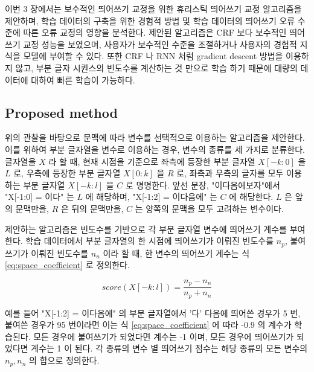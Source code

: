 \documentclass[11pt]{article}
\begin{document}
이번 3 장에서는 보수적인 띄어쓰기 교정을 위한 휴리스틱 띄어쓰기 교정 알고리즘을 제안하며, 학습 데이터의 구축을 위한 경험적 방법 및 학습 데이터의 띄어쓰기 오류 수준에 따른 오류 교정의 영향을 분석한다.
제안된 알고리즘은 CRF 보다 보수적인 띄어쓰기 교정 성능을 보였으며, 사용자가 보수적인 수준을 조절하거나 사용자의 경험적 지식을 모델에 부여할 수 있다.
또한 CRF 나 RNN 처럼 gradient descent 방법을 이용하지 않고, 부분 글자 시퀀스의 빈도수를 계산하는 것 만으로 학습 하기 때문에 대량의 데이터에 대하여 빠른 학습이 가능하다.

\subsection{Proposed method}

위의 관찰을 바탕으로 문맥에 따라 변수를 선택적으로 이용하는 알고리즘을 제안한다.
이를 위하여 부분 글자열을 변수로 이용하는 경우, 변수의 종류를 세 가지로 분류한다.
글자열을 $X$ 라 할 때, 현재 시점을 기준으로 좌측에 등장한 부분 글자열 $X[-k:0]$ 을 $L$ 로, 우측에 등장한 부분 글자열 $X[0:k]$ 을 $R$ 로, 좌측과 우측의 글자를 모두 이용하는 부분 글자열 $X[-k:l]$ 을 $C$ 로 명명한다.
앞선 문장, "이다음에보자"에서 "X[-1:0] = 이다" 는 $L$ 에 해당하며, "X[-1:2] = 이다음에" 는 $C$ 에 해당한다.
$L$ 은 앞의 문맥만을, $R$ 은 뒤의 문맥만을, $C$ 는 양쪽의 문맥을 모두 고려하는 변수이다.

제안하는 알고리즘은 빈도수를 기반으로 각 부분 글자열 변수에 띄어쓰기 계수를 부여한다.
학습 데이터에서 부분 글자열의 한 시점에 띄어쓰기가 이뤄진 빈도수를 $n_p$, 붙여쓰기가 이뤄진 빈도수를 $n_n$ 이라 할 때, 한 변수의 띄어쓰기 계수는 식 \ref{eq:space_coefficient} 로 정의한다.

\begin{equation}
  \label{eq:space_coefficient}
  score(X[-k:l]) = \frac{n_p - n_n}{n_p + n_n}
\end{equation}

예를 들어 "X[-1:2] = 이다음에" 의 부분 글자열에서 '다' 다음에 띄어쓴 경우가 5 번, 붙여쓴 경우가 95 번이라면 이는 식 \ref{eq:space_coefficient} 에 따라 -0.9 의 계수가 학습된다.
모든 경우에 붙여쓰기가 되었다면 계수는 -1 이며, 모든 경우에 띄어쓰기가 되었다면 계수는 1 이 된다.
각 종류의 변수 별 띄어쓰기 점수는 해당 종류의 모든 변수의 $n_p, n_n$ 의 합으로 정의한다.
\end{document}
